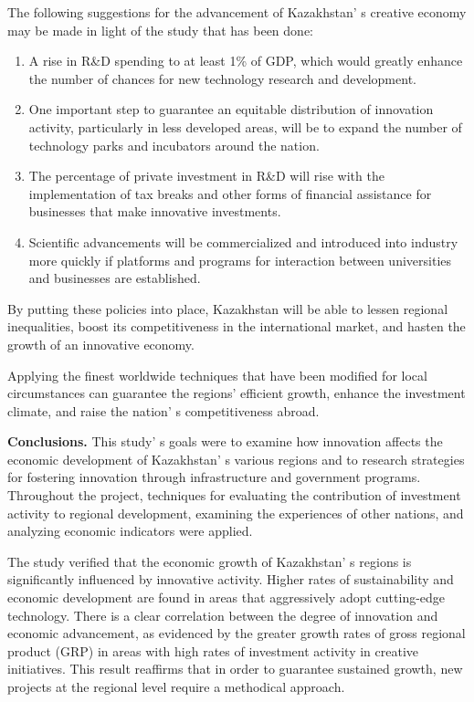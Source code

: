 The following suggestions for the advancement of
Kazakhstan' s creative economy may be made in light of
the study that has been done:

\begin{enumerate}
\def\labelenumi{\arabic{enumi}.}
\item
  A rise in R\&D spending to at least 1\% of GDP, which would greatly
  enhance the number of chances for new technology research and
  development.
\item
  One important step to guarantee an equitable distribution of
  innovation activity, particularly in less developed areas, will be to
  expand the number of technology parks and incubators around the
  nation.
\item
  The percentage of private investment in R\&D will rise with the
  implementation of tax breaks and other forms of financial assistance
  for businesses that make innovative investments.
\item
  Scientific advancements will be commercialized and introduced into
  industry more quickly if platforms and programs for interaction
  between universities and businesses are established.
\end{enumerate}

By putting these policies into place, Kazakhstan will be able to lessen
regional inequalities, boost its competitiveness in the international
market, and hasten the growth of an innovative economy.

Applying the finest worldwide techniques that have been modified for
local circumstances can guarantee the regions'{}
efficient growth, enhance the investment climate, and raise the
nation' s competitiveness abroad.

{\bfseries Conclusions.} This study' s goals were to examine
how innovation affects the economic development of
Kazakhstan' s various regions and to research strategies
for fostering innovation through infrastructure and government programs.
Throughout the project, techniques for evaluating the contribution of
investment activity to regional development, examining the experiences
of other nations, and analyzing economic indicators were applied.

The study verified that the economic growth of
Kazakhstan' s regions is significantly influenced by
innovative activity. Higher rates of sustainability and economic
development are found in areas that aggressively adopt cutting-edge
technology. There is a clear correlation between the degree of
innovation and economic advancement, as evidenced by the greater growth
rates of gross regional product (GRP) in areas with high rates of
investment activity in creative initiatives. This result reaffirms that
in order to guarantee sustained growth, new projects at the regional
level require a methodical approach.

